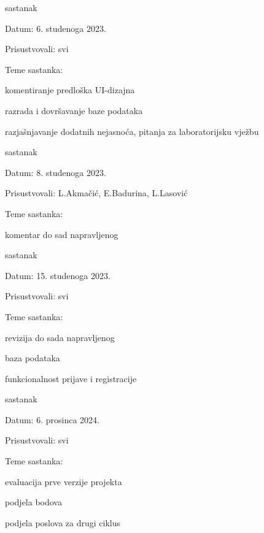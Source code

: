 \begin{packed_enum}
			\item  sastanak
			\item[] \begin{packed_item}
				\item Datum: 6. studenoga 2023.
				\item Prisustvovali: svi
				\item Teme sastanka:
				\begin{packed_item}
					\item  komentiranje predloška UI-dizajna
					\item  razrada i dovršavanje baze podataka
					\item  razjašnjavanje dodatnih nejasnoća, pitanja za laboratorijsku vježbu
				\end{packed_item}
			\end{packed_item}
			
			\item  sastanak			
			\item[] \begin{packed_item}
				\item Datum: 8. studenoga 2023.
				\item Prisustvovali: L.Akmačić, E.Badurina, L.Lasović
				\item Teme sastanka:
				\begin{packed_item}
					\item  komentar do sad napravljenog
				\end{packed_item}
			\end{packed_item}
			
			\item  sastanak			
			\item[] \begin{packed_item}
				\item Datum: 15. studenoga 2023.
				\item Prisustvovali: svi
				\item Teme sastanka:
				\begin{packed_item}
					\item  revizija do sada napravljenog
					\item  baza podataka
					\item  funkcionalnost prijave i registracije
				\end{packed_item}
			\end{packed_item}
			
			\item  sastanak			
			\item[] \begin{packed_item}
				\item Datum: 6. prosinca 2024.
				\item Prisustvovali: svi
				\item Teme sastanka:
				\begin{packed_item}
					\item  evaluacija prve verzije projekta
					\item  podjela bodova
					\item  podjela poslova za drugi ciklus
				\end{packed_item}
			\end{packed_item}
			

\end{packed_enum}
